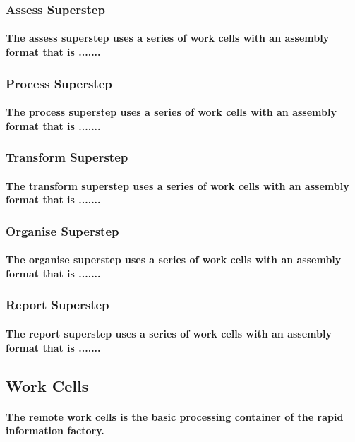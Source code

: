 \documentclass{acm_proc_article-sp}
\begin{document}
\subsubsection{Assess Superstep}
\paragraph{The assess superstep uses a series of work cells with an assembly format that is .......}
\subsubsection{Process Superstep}
\paragraph{The process superstep uses a series of work cells with an assembly format that is .......}
\subsubsection{Transform Superstep}
\paragraph{The transform superstep uses a series of work cells with an assembly format that is .......}
\subsubsection{Organise Superstep}
\paragraph{The organise superstep uses a series of work cells with an assembly format that is .......}
\subsubsection{Report Superstep}
\paragraph{The report superstep uses a series of work cells with an assembly format that is .......}
\subsection{Work Cells}
\paragraph{The remote work cells is the basic processing container of the rapid information factory.}
\end{document}
